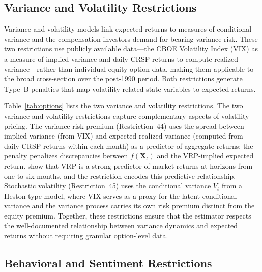 \subsection{Variance and Volatility Restrictions}\label{sub:option_restrictions}

Variance and volatility models link expected returns to measures of conditional variance and the compensation investors demand for bearing variance risk.
These two restrictions use publicly available data---the CBOE Volatility Index (VIX) as a measure of implied variance and daily CRSP returns to compute realized variance---rather than individual equity option data, making them applicable to the broad cross-section over the post-1990 period.
Both restrictions generate Type~B penalties that map volatility-related state variables to expected returns.

Table~\ref{tab:options} lists the two variance and volatility restrictions. The two variance and volatility restrictions capture complementary aspects of volatility pricing.
The variance risk premium (Restriction~44) uses the spread between implied variance (from VIX) and expected realized variance (computed from daily CRSP returns within each month) as a predictor of aggregate returns; the penalty penalizes discrepancies between $f(\mathbf{X}_t)$ and the VRP-implied expected return.
\citet{bollerslevtauchenzhou2009} show that VRP is a strong predictor of market returns at horizons from one to six months, and the restriction encodes this predictive relationship.
Stochastic volatility (Restriction~45) uses the conditional variance $V_t$ from a Heston-type model, where VIX serves as a proxy for the latent conditional variance and the variance process carries its own risk premium distinct from the equity premium.
Together, these restrictions ensure that the estimator respects the well-documented relationship between variance dynamics and expected returns without requiring granular option-level data.


\subsection{Behavioral and Sentiment Restrictions}\label{sub:behavioral_restrictions}


